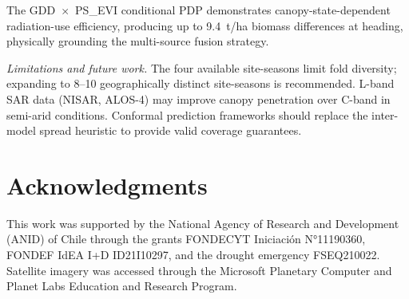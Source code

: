 \documentclass[lettersize,journal]{IEEEtran}
\begin{document}
The GDD~$\times$~PS\_EVI conditional PDP demonstrates canopy-state-dependent
radiation-use efficiency, producing up to 9.4~t/ha biomass differences at
heading, physically grounding the multi-source fusion strategy.

\textit{Limitations and future work.} The four available site-seasons limit
fold diversity; expanding to 8--10 geographically distinct site-seasons is
recommended. L-band SAR data (NISAR, ALOS-4) may improve canopy penetration
over C-band in semi-arid conditions. Conformal prediction frameworks should
replace the inter-model spread heuristic to provide valid coverage guarantees.

\section*{Acknowledgments}

This work was supported by the National Agency of Research and Development (ANID) of Chile through the grants FONDECYT Iniciación N°11190360, FONDEF IdEA I+D ID21I10297, and the drought emergency FSEQ210022. Satellite imagery was accessed through the Microsoft Planetary Computer and Planet Labs Education and Research Program.
\end{document}
